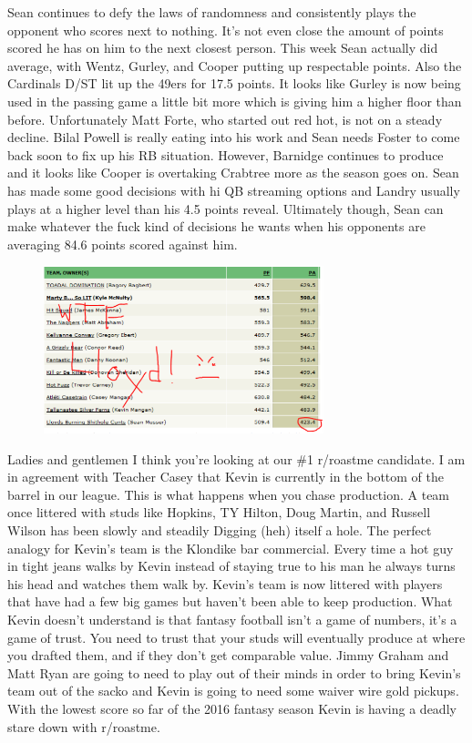 \documentclass[11pt,letterpaper]{article}
\begin{document}
\newpage
{}
\par\noindent Sean continues to defy the laws of randomness and consistently plays the opponent who scores next to nothing. It's not even close the amount of points scored he has on him to the next closest person. This week Sean actually did average, with Wentz, Gurley, and Cooper putting up respectable points. Also the Cardinals D/ST lit up the 49ers for 17.5 points. It looks like Gurley is now being used in the passing game a little bit more which is giving him a higher floor than before. Unfortunately Matt Forte, who started out red hot, is not on a steady decline. Bilal Powell is really eating into his work and Sean needs Foster to come back soon to fix up his RB situation. However, Barnidge continues to produce and it looks like Cooper is overtaking Crabtree more as the season goes on. Sean has made some good decisions with hi QB streaming options and Landry usually plays at a higher level than his 4.5 points reveal. Ultimately though, Sean can make whatever the fuck kind of decisions he wants when his opponents are averaging 84.6 points scored against him. 
\begin{figure}
\centering
\includegraphics[width=0.725\textwidth]{week5-lloyd.png}
\label{fig:week5-lloyd}
\end{figure}
\bigskip
\par\noindent Ladies and gentlemen I think you’re looking at our \#1 r/roastme candidate. I am in agreement with Teacher Casey that Kevin is currently in the bottom of the barrel in our league.  This is what happens when you chase production. A team once littered with studs like Hopkins, TY Hilton, Doug Martin, and Russell Wilson has been slowly and steadily Digging (heh) itself a hole. The perfect analogy for Kevin's team is the Klondike bar commercial. Every time a hot guy in tight jeans walks by Kevin instead of staying true to his man he always turns his head and watches them walk by. Kevin's team is now littered with players that have had a few big games but haven't been able to keep production. What Kevin doesn't understand is that fantasy football isn't a game of numbers, it's a game of trust. You need to trust that your studs will eventually produce at where you drafted them, and if they don't get comparable value. Jimmy Graham and Matt Ryan are going to need to play out of their minds in order to bring Kevin's team out of the sacko and Kevin is going to need some waiver wire gold pickups. With the lowest score so far of the 2016 fantasy season Kevin is having a deadly stare down with r/roastme.
\end{document}
